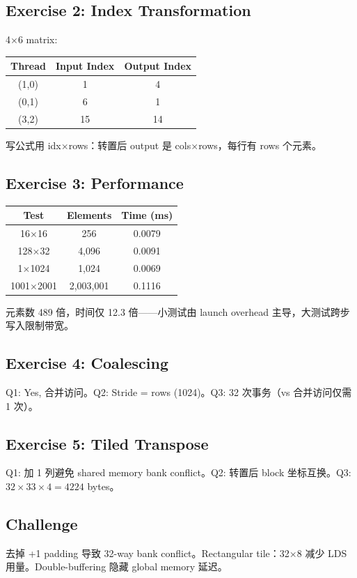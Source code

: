 \documentclass[a4paper]{article}
\begin{document}
\subsection*{Exercise 2: Index Transformation}
4$\times$6 matrix:
\begin{tabular}{|c|c|c|}
\hline
Thread & Input Index & Output Index \\
\hline
(1,0) & 1 & 4 \\
(0,1) & 6 & 1 \\
(3,2) & 15 & 14 \\
\hline
\end{tabular}
写公式用 idx$\times$rows：转置后 output 是 cols$\times$rows，每行有 rows 个元素。

\subsection*{Exercise 3: Performance}
\begin{tabular}{|c|c|c|}
\hline
Test & Elements & Time (ms) \\
\hline
16$\times$16 & 256 & 0.0079 \\
128$\times$32 & 4,096 & 0.0091 \\
1$\times$1024 & 1,024 & 0.0069 \\
1001$\times$2001 & 2,003,001 & 0.1116 \\
\hline
\end{tabular}
元素数 489 倍，时间仅 12.3 倍——小测试由 launch overhead 主导，大测试跨步写入限制带宽。

\subsection*{Exercise 4: Coalescing}
Q1: Yes, 合并访问。Q2: Stride = rows (1024)。Q3: 32 次事务（vs 合并访问仅需 1 次）。

\subsection*{Exercise 5: Tiled Transpose}
Q1: 加 1 列避免 shared memory bank conflict。Q2: 转置后 block 坐标互换。Q3: $32 \times 33 \times 4 = 4224$ bytes。

\subsection*{Challenge}
去掉 +1 padding 导致 32-way bank conflict。Rectangular tile：32$\times$8 减少 LDS 用量。Double-buffering 隐藏 global memory 延迟。
\end{document}
